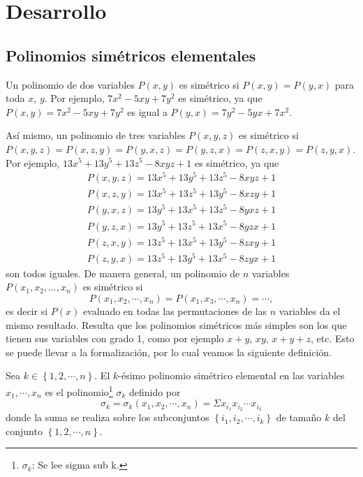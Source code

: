 \section{Desarrollo}

\subsection{Polinomios simétricos elementales}

Un polinomio de dos variables $P(x, y)$ es simétrico si $P(x, y) = P(y, x)$ para toda $x$, $y$.
Por ejemplo, $7x^2 - 5xy + 7y^2$ es simétrico, ya que $P(x, y) = 7x^2 - 5xy + 7y^2$ es igual a $P(y, x) = 7y^2 - 5yx + 7x^2$.

Así mismo, un polinomio de tres variables $P(x, y, z)$ es simétrico si $P(x, y, z) = P(x, z, y) = P(y, x, z) = P(y, z, x) = P(z, x, y) = P(z, y, x)$.
Por ejemplo, $13x^5 + 13y^5 + 13z^5 - 8xyz + 1$ es simétrico, ya que
\begin{align*}
    P(x, y, z) = 13x^5 + 13y^5 + 13z^5 - 8xyz + 1\\
    P(x, z, y) = 13x^5 + 13z^5 + 13y^5 - 8xzy + 1\\
    P(y, x, z) = 13y^5 + 13x^5 + 13z^5 - 8yxz + 1\\
    P(y, z, x) = 13y^5 + 13z^5 + 13x^5 - 8yzx + 1\\
    P(z, x, y) = 13z^5 + 13x^5 + 13y^5 - 8zxy + 1\\
    P(z, y, x) = 13z^5 + 13y^5 + 13x^5 - 8zyx + 1
\end{align*}
son todos iguales.
De manera general, un polinomio de $n$ variables $P(x_1, x_2, \dots, x_n)$ es simétrico si
\[
    P(x_1, x_2, \cdots, x_n) = P(x_1, x_3, \cdots, x_n) = \cdots,
\]
es decir si $P(x)$ evaluado en todas las permutaciones de las $n$ variables da el mismo resultado.
Resulta que los polinomios simétricos más simples son los que tienen sus variables con grado 1, como por ejemplo $x + y$, $xy$, $x + y + z$, etc.
Esto se puede llevar a la formalización, por lo cual veamos la siguiente definición.

\begin{definition}
    Sea $k \in \left\{ 1, 2, \cdots, n \right\}$.
    El $k$-ésimo polinomio simétrico elemental en las variables $x_1, \cdots, x_n$ es el polinomio\footnote{$\sigma_k$: Se lee sigma sub k.} $\sigma_k$ definido por
    \[
        \sigma_k = \sigma_k(x_1, x_2, \cdots, x_n) = \Sigma x_{i_1} x_{i_2} \cdots x_{i_k}
    \]
    donde la suma se realiza sobre los subconjuntos $\left\{ i_1, i_2, \cdots, i_k \right\}$ de tamaño $k$ del conjunto $\left\{ 1, 2, \cdots, n\right\}$.
\end{definition}

